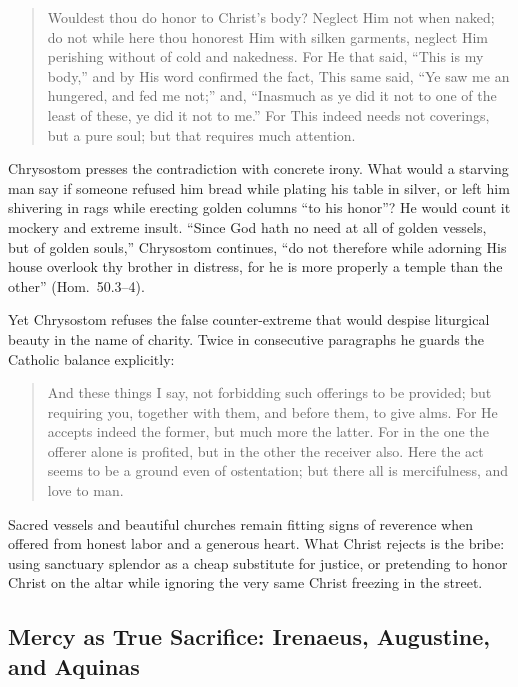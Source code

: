 \begin{quote}
Wouldest thou do honor to Christ's body? Neglect Him not when naked; do not while here thou honorest Him with silken garments, neglect Him perishing without of cold and nakedness. For He that said, ``This is my body,'' and by His word confirmed the fact, This same said, ``Ye saw me an hungered, and fed me not;'' and, ``Inasmuch as ye did it not to one of the least of these, ye did it not to me.'' For This indeed needs not coverings, but a pure soul; but that requires much attention.
\end{quote}

Chrysostom presses the contradiction with concrete irony. What would a starving man say if someone refused him bread while plating his table in silver, or left him shivering in rags while erecting golden columns ``to his honor''? He would count it mockery and extreme insult. ``Since God hath no need at all of golden vessels, but of golden souls,'' Chrysostom continues, ``do not therefore while adorning His house overlook thy brother in distress, for he is more properly a temple than the other'' (Hom.\ 50.3--4).

Yet Chrysostom refuses the false counter-extreme that would despise liturgical beauty in the name of charity. Twice in consecutive paragraphs he guards the Catholic balance explicitly:

\begin{quote}
And these things I say, not forbidding such offerings to be provided; but requiring you, together with them, and before them, to give alms. For He accepts indeed the former, but much more the latter. For in the one the offerer alone is profited, but in the other the receiver also. Here the act seems to be a ground even of ostentation; but there all is mercifulness, and love to man.
\end{quote}

Sacred vessels and beautiful churches remain fitting signs of reverence when offered from honest labor and a generous heart. What Christ rejects is the bribe: using sanctuary splendor as a cheap substitute for justice, or pretending to honor Christ on the altar while ignoring the very same Christ freezing in the street.

\subsection{Mercy as True Sacrifice: Irenaeus, Augustine, and Aquinas}

